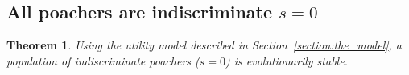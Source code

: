 \documentclass[10pt]{article}
\newtheorem{theorem}{Theorem}
\begin{document}
\subsection{All poachers are indiscriminate \(s=0\)}

\begin{theorem}
Using the utility model described in Section~\ref{section:the_model}, a population 
of indiscriminate poachers (\(s=0\)) is evolutionarily stable.
\end{theorem}










\end{document}
